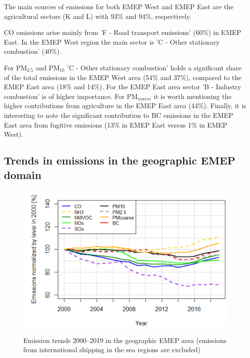 The main sources of \nhiii emissions for both EMEP West and EMEP East are the
agricultural sectors (K and L) with 93\% and 94\%, respectively.

CO emissions arise mainly from 'F - Road transport emissions' (60\%) in EMEP East. In the EMEP West region the main sector is 'C - Other stationary combustion' (40\%).

For PM$_{2.5}$ and PM$_{10}$ 'C - Other stationary combustion' holds a 
significant share of the total emissions in the EMEP West area (54\% and 37\%), compared to the EMEP East area (18\% and 14\%). For the
EMEP East area sector 'B - Industry combustion' is of higher importance. For PM$_{coarse}$ it is worth mentioning the higher contributions from agriculture in the EMEP East area (44\%). Finally, it is interesting to note the significant contribution to BC emissions in the EMEP East area from fugitive emissions (13\% in EMEP East versus 1\% in EMEP West). 


\subsection{Trends in emissions in the geographic EMEP domain}
\label{sec:emistrends}

\begin{figure}[b]
\centering
{\includegraphics*[viewport=1 1 565 370,clip,width=0.75\linewidth]{FIGS_CEIP/Fig8.pdf}}
\caption{Emission trends 2000--2019 in the geographic EMEP area (emissions from international shipping in the sea regions are excluded)}
\label{fig:CEIP8}
\end{figure}

